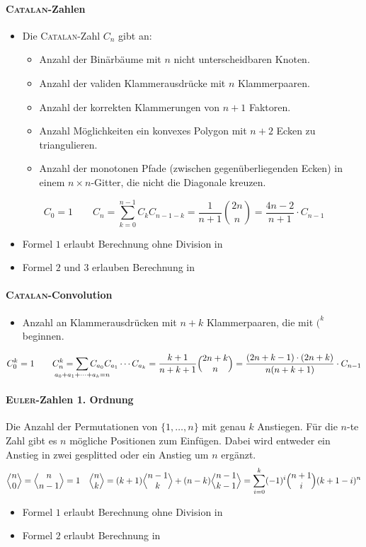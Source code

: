 \paragraph{\textsc{Catalan}-Zahlen}
\begin{itemize}
	\item Die \textsc{Catalan}-Zahl $C_n$ gibt an:
	\begin{itemize}
		\item Anzahl der Binärbäume mit $n$ nicht unterscheidbaren Knoten.
		\item Anzahl der validen Klammerausdrücke mit $n$ Klammerpaaren.
		\item Anzahl der korrekten Klammerungen von $n+1$ Faktoren.
		\item Anzahl Möglichkeiten ein konvexes Polygon mit $n + 2$ Ecken zu triangulieren.
		\item Anzahl der monotonen Pfade (zwischen gegenüberliegenden Ecken) in
		einem $n \times n$-Gitter, die nicht die Diagonale kreuzen.
	\end{itemize}
\end{itemize}
\[C_0 = 1\qquad C_n = \sum\limits_{k = 0}^{n - 1} C_kC_{n - 1 - k} =
\frac{1}{n + 1}\binom{2n}{n} = \frac{4n - 2}{n+1} \cdot C_{n-1}\]
\begin{itemize}
	\item Formel $1$ erlaubt Berechnung ohne Division in 
	\item Formel $2$ und $3$ erlauben Berechnung in 
\end{itemize}

\paragraph{\textsc{Catalan}-Convolution}
\begin{itemize}
	\item Anzahl an Klammerausdrücken mit $n+k$ Klammerpaaren, die mit $(^k$ beginnen.
\end{itemize}
\[C^k_0 = 1\qquad C^k_n = \sum\limits_{\mathclap{a_0+a_1+\dots+a_k=n}} C_{a_0}C_{a_1}\cdots C_{a_k} =
\frac{k+1}{n+k+1}\binom{2n+k}{n} = \frac{(2n+k-1)\cdot(2n+k)}{n(n+k+1)} \cdot C_{n-1}\]

\paragraph{\textsc{Euler}-Zahlen 1. Ordnung}
Die Anzahl der Permutationen von $\{1, \ldots, n\}$ mit genau $k$ Anstiegen.
Für die $n$-te Zahl gibt es $n$ mögliche Positionen zum Einfügen.
Dabei wird entweder ein Anstieg in zwei gesplitted oder ein Anstieg um $n$ ergänzt.
\[\Bigl\langle \begin{matrix} n \\ 0 \end{matrix} \Bigr\rangle = \Bigl\langle \begin{matrix} n \\ n-1 \end{matrix} \Bigr\rangle = 1 \quad
\Bigl\langle \begin{matrix} n \\ k \end{matrix} \Bigr\rangle = (k+1) \Bigl\langle \begin{matrix} n-1 \\ k \end{matrix} \Bigr\rangle + (n-k) \Bigl\langle \begin{matrix} n-1 \\ k-1 \end{matrix} \Bigr\rangle=
\sum_{i=0}^{k} (-1)^i\Bigl( \begin{matrix} n+1 \\ i \end{matrix} \Bigr)(k+1-i)^n\]
\begin{itemize}
	\item Formel $1$ erlaubt Berechnung ohne Division in 
	\item Formel $2$ erlaubt Berechnung in 
\end{itemize}

